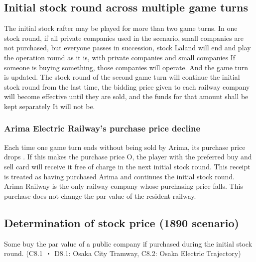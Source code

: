 \documentclass{article}
\begin{document}
\begin{CJK}{UTF8}{min}
\subsection{Initial stock round across multiple game turns}
The initial stock rafter may be played for more than two game
turns. In one stock round, if all private companies used in the
scenario, small companies are not purchased, but everyone passes in
succession, stock Laland will end and play the operation round as it
is, with private companies and small companies If someone is buying
something, those companies will operate. And the game turn is
updated. The stock round of the second game turn will continue the
initial stock round from the last time, the bidding price given to
each railway company will become effective until they are sold, and
the funds for that amount shall be kept separately It will not be.

\subsubsection{Arima Electric Railway's purchase price decline}
Each time one game turn ends without being sold by Arima, its purchase
price drops . If this makes the purchase price \yen O, the
player with the preferred buy and sell card will receive it free of
charge in the next initial stock round. This receipt is treated as
having purchased Arima and continues the initial stock round. Arima
Railway is the only railway company whose purchasing price falls. This
purchase does not change the par value of the resident railway.

\subsection{Determination of stock price (1890 scenario)}
Some buy the par value of a public company if purchased during the initial stock round. (C8.1 ・ D8.1: Osaka City Tramway, C8.2: Osaka Electric Trajectory)






\end{CJK}
\end{document}

